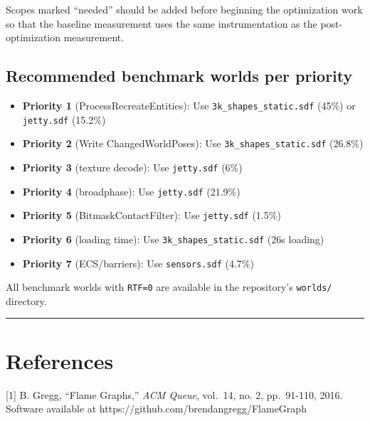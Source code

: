 \documentclass[11pt, a4paper]{article}
\providecommand{\tightlist}{%
  \setlength{\itemsep}{0pt}\setlength{\parskip}{0pt}}
\begin{document}
Scopes marked ``needed'' should be added before beginning the optimization work so that the baseline measurement uses the same instrumentation as the post-optimization measurement.

\subsection{Recommended benchmark worlds per priority}

\begin{itemize}
\tightlist
\item \textbf{Priority 1} (ProcessRecreateEntities): Use \texttt{3k\_shapes\_static.sdf} (45\%) or \texttt{jetty.sdf} (15.2\%)
\item \textbf{Priority 2} (Write ChangedWorldPoses): Use \texttt{3k\_shapes\_static.sdf} (26.8\%)
\item \textbf{Priority 3} (texture decode): Use \texttt{jetty.sdf} (6\%)
\item \textbf{Priority 4} (broadphase): Use \texttt{jetty.sdf} (21.9\%)
\item \textbf{Priority 5} (BitmaskContactFilter): Use \texttt{jetty.sdf} (1.5\%)
\item \textbf{Priority 6} (loading time): Use \texttt{3k\_shapes\_static.sdf} (26s loading)
\item \textbf{Priority 7} (ECS/barriers): Use \texttt{sensors.sdf} (4.7\%)
\end{itemize}

All benchmark worlds with \texttt{RTF=0} are available in the repository's \texttt{worlds/} directory.

\begin{center}\rule{0.5\linewidth}{0.5pt}\end{center}

\section{References}

{[}1{]} B. Gregg, ``Flame Graphs,'' \emph{ACM Queue}, vol.~14, no. 2,
pp.~91-110, 2016. Software available at
https://github.com/brendangregg/FlameGraph
\end{document}
